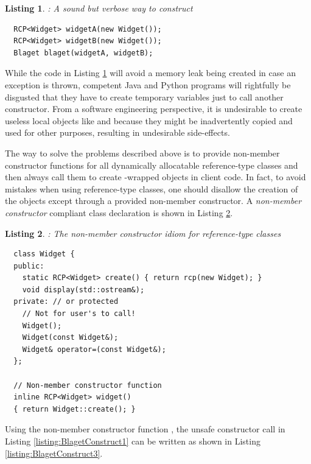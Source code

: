 \documentclass[pdf,ps2pdf,11pt]{SANDreport}
\newtheorem{listing}{Listing}
\begin{document}
\begin{listing}: A sound but verbose way to construct \\
\label{listing:BlagetConstruct2}
{\small\begin{verbatim}
  RCP<Widget> widgetA(new Widget());
  RCP<Widget> widgetB(new Widget());
  Blaget blaget(widgetA, widgetB);
\end{verbatim}}
\end{listing}

While the code in Listing {}\ref{listing:BlagetConstruct2} will avoid a
memory leak being created in case an exception is thrown, competent
Java and Python programs will rightfully be disgusted that they have
to create temporary variables just to call another constructor.  From
a software engineering perspective, it is undesirable to create
useless local {} objects like {} and
{} because they might be inadvertently copied and used
for other purposes, resulting in undesirable side-effects.

The way to solve the problems described above is to provide non-member
constructor functions for all dynamically allocatable reference-type
classes and then always call them to create {}-wrapped
objects in client code.  In fact, to avoid mistakes when using
reference-type classes, one should disallow the creation of the
objects except through a provided non-member constructor.  A
{}\textit{non-member constructor} compliant {} class
declaration is shown in Listing
{}\ref{listing:WidgetNonmemberConstructor}.

{}\begin{listing}: The non-member constructor idiom for reference-type
classes
\label{listing:WidgetNonmemberConstructor}
{\small\begin{verbatim}
  class Widget {
  public:
    static RCP<Widget> create() { return rcp(new Widget); }
    void display(std::ostream&);
  private: // or protected
    // Not for user's to call!
    Widget();
    Widget(const Widget&);
    Widget& operator=(const Widget&);
  };

  // Non-member constructor function
  inline RCP<Widget> widget()
  { return Widget::create(); }
\end{verbatim}}
\end{listing}

Using the non-member constructor function {}, the unsafe
constructor call in Listing {}\ref{listing:BlagetConstruct1} can be
written as shown in Listing {}\ref{listing:BlagetConstruct3}.
\end{document}
